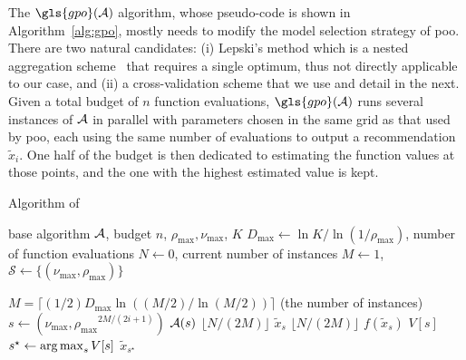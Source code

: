 The $\gls{gpo}(\cA)$ algorithm, whose pseudo-code is shown in Algorithm~\ref{alg:gpo},  mostly needs to modify the model selection strategy of \gls{poo}. There are two natural candidates: (i) Lepski's method which is a nested aggregation scheme~\citep{lepski1992,lepski1997,locatelli2017adaptivity,locatelli2018adaptivity} that requires a single optimum, thus not directly applicable to our case, and (ii) a cross-validation scheme that we use and detail in the next. Given a total budget of $n$ function evaluations, $\gls{gpo}(\cA)$ runs several instances of $\mathcal{A}$ in parallel with parameters chosen in the same grid as that used by \gls{poo}, each using the same number of evaluations to output a recommendation $\tilde{x}_i$. One half of the budget is then dedicated to estimating the function values at those points, and the one with the highest estimated value is kept. 

\begin{algorithm}[ht]
\centering
\caption{Algorithm of \GPO{}}
\label{alg:gpo}
\begin{algorithmic}[1]
     base algorithm $\mathcal{A}$, budget $n$, $\rho_{\max}, \nu_{\max}$, $K$
     $D_{\max} \gets \ln K/\ln\left( 1/\rho_{\max}\right)$, number of function evaluations $N \gets 0$, current number of \HCT instances $M \gets 1$, $\mathcal{S} \gets \{(\nu_{\max},\rho_{\max})\}$

    \State {} $M = \lceil (1/2)D_{\max}\ln((M/2)/\ln(M/2))\rceil$ (the number of instances)
    	\State $s \gets \left(\nu_{\max},{\rho_{\max}}^{2M/(2i+1)}\right)$
		\State {} $\mathcal{A}(s)$  $\lfloor N/(2M)\rfloor$ 
		\State {} $\tilde x_s$
		\State {} $\lfloor N/(2M)\rfloor$  $f(\tilde{x}_s)$
		\State {} $V[s]$
	\EndFor
    \State ${s^\star} \gets \operatorname*{arg\,max}_{s} V[s]$
     $\tilde x_{s^\star}$
\end{algorithmic}
\end{algorithm}

